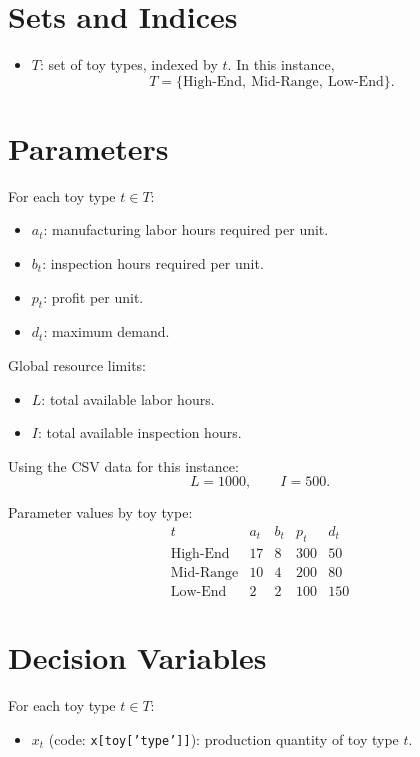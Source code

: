 \section*{Sets and Indices}

\begin{itemize}
    \item $T$: set of toy types, indexed by $t$. In this instance,
    \[
    T=\{\text{High-End},\ \text{Mid-Range},\ \text{Low-End}\}.
    \]
\end{itemize}

\section*{Parameters}

For each toy type $t \in T$:
\begin{itemize}
    \item $a_t$: manufacturing labor hours required per unit.
    \item $b_t$: inspection hours required per unit.
    \item $p_t$: profit per unit.
    \item $d_t$: maximum demand.
\end{itemize}

Global resource limits:
\begin{itemize}
    \item $L$: total available labor hours.
    \item $I$: total available inspection hours.
\end{itemize}

Using the CSV data for this instance:
\[
L=1000, \qquad I=500.
\]

Parameter values by toy type:
\[
\begin{array}{c|cccc}
t & a_t & b_t & p_t & d_t \\ \hline
\text{High-End} & 17 & 8 & 300 & 50 \\
\text{Mid-Range} & 10 & 4 & 200 & 80 \\
\text{Low-End} & 2 & 2 & 100 & 150
\end{array}
\]

\section*{Decision Variables}

For each toy type $t \in T$:
\begin{itemize}
    \item $x_t$ (code: \texttt{x[toy['type']]}): production quantity of toy type $t$.
\end{itemize}

